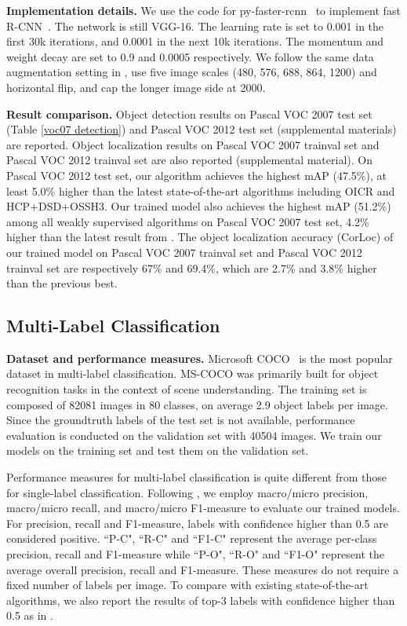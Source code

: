 \documentclass[10pt,twocolumn,letterpaper]{article}
\begin{document}
\noindent\textbf{Implementation details.} We use the code for py-faster-rcnn~\cite{renNIPS15fasterrcnn} to implement fast R-CNN~\cite{girshick2015fast}. The network is still VGG-16. The learning rate is set to 0.001 in the first 30k iterations, and 0.0001 in the next 10k iterations. The momentum and weight decay are set to 0.9 and 0.0005 respectively. We follow the same data augmentation setting in \cite{tang2017multiple}, use five image scales (480, 576, 688, 864, 1200) and horizontal flip, and cap the longer image side at 2000.

\noindent\textbf{Result comparison.} Object detection results on Pascal VOC 2007 test set (Table \ref{voc07 detection}) and Pascal VOC 2012 test set (supplemental materials) are reported. Object localization results on Pascal VOC 2007 trainval set and Pascal VOC 2012 trainval set are also reported (supplemental material). On Pascal VOC 2012 test set, our algorithm achieves the highest mAP (47.5\%), at least 5.0\% higher than the latest state-of-the-art algorithms including OICR \cite{tang2017multiple} and HCP+DSD+OSSH3\cite{jie2017deep}. Our trained model also achieves the highest mAP (51.2\%) among all weakly supervised algorithms on Pascal VOC 2007 test set,
4.2\% higher than the latest result from \cite{tang2017multiple}. The object localization accuracy (CorLoc) of our trained model on Pascal VOC 2007 trainval set and Pascal VOC 2012 trainval set are respectively 67\% and 69.4\%, which are 2.7\% and 3.8\% higher than the previous best.


\subsection{Multi-Label Classification}\vspace{-2mm}
\noindent\textbf{Dataset and performance measures.} Microsoft COCO~\cite{lin2014microsoft} is the most popular dataset in multi-label classification. MS-COCO was primarily built for object recognition tasks in the context of scene understanding. The training set is composed of 82081 images in 80 classes, on average 2.9 object labels per image. Since the groundtruth labels of the test set is not available, performance evaluation is conducted on the validation set with 40504 images. We train our models on the training set and test them on the validation set.

Performance measures for multi-label classification is quite different from those for single-label classification. Following \cite{zhu2017learning, wang2017multi}, we employ macro/micro precision, macro/micro recall, and macro/micro F1-measure to evaluate our trained models. For precision, recall and F1-measure, labels with confidence higher than 0.5 are considered positive. ``P-C", ``R-C" and ``F1-C" represent the average per-class precision, recall and F1-measure while ``P-O", ``R-O" and ``F1-O" represent the average overall precision, recall and F1-measure. These measures do not require a fixed number of labels per image. To compare with existing state-of-the-art algorithms, we also report the results of top-3 labels with confidence higher than 0.5 as in \cite{wang2017multi}.
\end{document}
